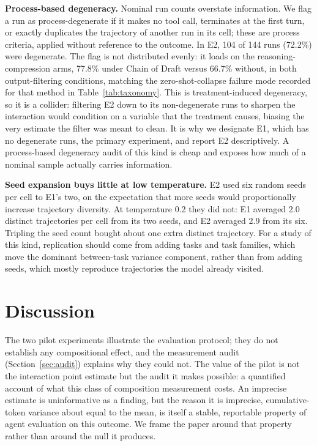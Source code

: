 \documentclass{article}
\begin{document}
\textbf{Process-based degeneracy.} Nominal run counts overstate information. We flag a run as process-degenerate if it makes no tool call, terminates at the first turn, or exactly duplicates the trajectory of another run in its cell; these are process criteria, applied without reference to the outcome. In E2, 104 of 144 runs (72.2\%) were degenerate. The flag is not distributed evenly: it loads on the reasoning-compression arms, 77.8\% under Chain of Draft versus 66.7\% without, in both output-filtering conditions, matching the zero-shot-collapse failure mode recorded for that method in Table~\ref{tab:taxonomy}. This is treatment-induced degeneracy, so it is a collider: filtering E2 down to its non-degenerate runs to sharpen the interaction would condition on a variable that the treatment causes, biasing the very estimate the filter was meant to clean. It is why we designate E1, which has no degenerate runs, the primary experiment, and report E2 descriptively. A process-based degeneracy audit of this kind is cheap and exposes how much of a nominal sample actually carries information.

\textbf{Seed expansion buys little at low temperature.} E2 used six random seeds per cell to E1's two, on the expectation that more seeds would proportionally increase trajectory diversity. At temperature 0.2 they did not: E1 averaged 2.0 distinct trajectories per cell from its two seeds, and E2 averaged 2.9 from its six. Tripling the seed count bought about one extra distinct trajectory. For a study of this kind, replication should come from adding tasks and task families, which move the dominant between-task variance component, rather than from adding seeds, which mostly reproduce trajectories the model already visited.

\section{Discussion}
\label{sec:discussion}

The two pilot experiments illustrate the evaluation protocol; they do not establish any compositional effect, and the measurement audit (Section~\ref{sec:audit}) explains why they could not. The value of the pilot is not the interaction point estimate but the audit it makes possible: a quantified account of what this class of composition measurement costs. An imprecise estimate is uninformative as a finding, but the reason it is imprecise, cumulative-token variance about equal to the mean, is itself a stable, reportable property of agent evaluation on this outcome. We frame the paper around that property rather than around the null it produces.
\end{document}
